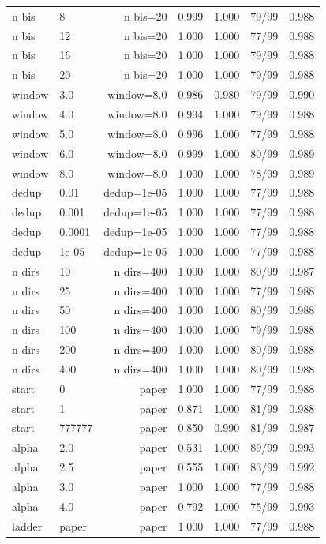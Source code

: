 \begin{tabular*}{\linewidth}{@{\extracolsep{\fill}}llrcccc@{}}
n bis & 8 & n bis=20 & 0.999 & 1.000 & 79/99 & 0.988\\
n bis & 12 & n bis=20 & 1.000 & 1.000 & 77/99 & 0.988\\
n bis & 16 & n bis=20 & 1.000 & 1.000 & 79/99 & 0.988\\
n bis & 20 & n bis=20 & 1.000 & 1.000 & 79/99 & 0.988\\
window & 3.0 & window=8.0 & 0.986 & 0.980 & 79/99 & 0.990\\
window & 4.0 & window=8.0 & 0.994 & 1.000 & 79/99 & 0.988\\
window & 5.0 & window=8.0 & 0.996 & 1.000 & 77/99 & 0.988\\
window & 6.0 & window=8.0 & 0.999 & 1.000 & 80/99 & 0.989\\
window & 8.0 & window=8.0 & 1.000 & 1.000 & 78/99 & 0.989\\
dedup & 0.01 & dedup=1e-05 & 1.000 & 1.000 & 77/99 & 0.988\\
dedup & 0.001 & dedup=1e-05 & 1.000 & 1.000 & 77/99 & 0.988\\
dedup & 0.0001 & dedup=1e-05 & 1.000 & 1.000 & 77/99 & 0.988\\
dedup & 1e-05 & dedup=1e-05 & 1.000 & 1.000 & 77/99 & 0.988\\
n dirs & 10 & n dirs=400 & 1.000 & 1.000 & 80/99 & 0.987\\
n dirs & 25 & n dirs=400 & 1.000 & 1.000 & 77/99 & 0.988\\
n dirs & 50 & n dirs=400 & 1.000 & 1.000 & 80/99 & 0.988\\
n dirs & 100 & n dirs=400 & 1.000 & 1.000 & 79/99 & 0.988\\
n dirs & 200 & n dirs=400 & 1.000 & 1.000 & 80/99 & 0.988\\
n dirs & 400 & n dirs=400 & 1.000 & 1.000 & 80/99 & 0.988\\
start & 0 & paper & 1.000 & 1.000 & 77/99 & 0.988\\
start & 1 & paper & 0.871 & 1.000 & 81/99 & 0.988\\
start & 777777 & paper & 0.850 & 0.990 & 81/99 & 0.987\\
alpha & 2.0 & paper & 0.531 & 1.000 & 89/99 & 0.993\\
alpha & 2.5 & paper & 0.555 & 1.000 & 83/99 & 0.992\\
alpha & 3.0 & paper & 1.000 & 1.000 & 77/99 & 0.988\\
alpha & 4.0 & paper & 0.792 & 1.000 & 75/99 & 0.993\\
ladder & paper & paper & 1.000 & 1.000 & 77/99 & 0.988\\

\end{tabular*}
